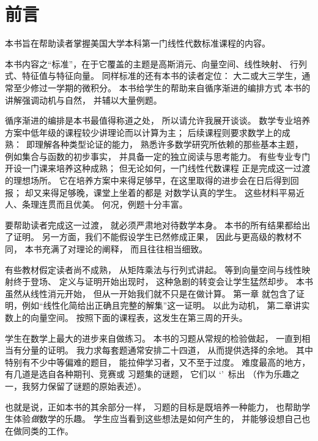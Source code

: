 {\setlength{\parskip}{.7ex}  %
\chapter*{前言}
本书旨在帮助读者掌握美国大学本科第一门线性代数标准课程的内容。

本书内容之“标准”，在于它覆盖的主题是高斯消元、向量空间、线性映射、
行列式、特征值与特征向量。
同样标准的还有本书的读者定位：
大二或大三学生，通常至少修过一学期的微积分。
本书给学生的帮助来自循序渐进的编排方式\Dash
本书的讲解强调动机与自然，
并辅以大量例题。

循序渐进的编排是本书最值得称道之处，
所以请允许我展开谈谈。
数学专业培养方案中低年级的课程较少讲理论而以计算为主；
后续课程则要求数学上的成熟：~即理解各种类型论证的能力，
熟悉许多数学研究所依赖的那些基本主题，
例如集合与函数的初步事实，
并具备一定的独立阅读与思考能力。
有些专业专门开设一门课来培养这种成熟；
但无论如何，一门线性代数课程
正是完成这一过渡的理想场所。
它在培养方案中来得足够早，在这里取得的进步会在日后得到回报；
却又来得足够晚，课堂上坐着的都是
对数学认真的学生。
这些材料平易近人、条理连贯而且优美。
何况，例题十分丰富。

要帮助读者完成这一过渡，
就必须严肃地对待数学本身。
本书的所有结果都给出了证明。
另一方面，我们不能假设学生已然修成正果，
因此与更高级的教材不同，
本书充满了对理论的阐释，
而且往往相当细致。

有些教材假定读者尚不成熟，
从矩阵乘法与行列式讲起。
等到向量空间与线性映射终于登场、
定义与证明开始出现时，
这种急剧的转变会让学生猛然却步。
本书虽然从线性消元开始，
但从一开始我们就不只是在做计算。
第一章
就包含了证明，例如“线性化简给出正确且完整的解集”这一证明。
以此为动机，
第二章讲实数上的向量空间。
按照下面的课程表，这发生在第三周的开头。

学生在数学上最大的进步来自做练习。
本书的习题从常规的检验做起，
一直到相当有分量的证明。
我力求每套题通常安排二十四道，
从而提供选择的余地。
其中特别有不少中等偏难的题目，
能拉伸学习者，又不至于过度。
难度最高的地方，有几道是选自各种期刊、竞赛或
习题集的谜题，
它们以
`\puzzlemark'\
标出
（作为乐趣之一，我努力保留了谜题的原始表述）。

也就是说，正如本书的其余部分一样，
习题的目标是既培养一种能力，
也帮助学生体验\emph{做}数学的乐趣。
学生应当看到这些想法是如何产生的，
并能够设想自己也在做同类的工作。


}
